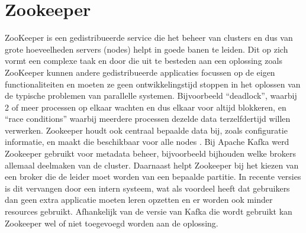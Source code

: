 \section{Zookeeper}
ZooKeeper is een gedistribueerde service die het beheer van clusters en dus van grote hoeveelheden servers (nodes) helpt in goede banen te leiden. Dit op zich vormt een complexe taak en door die uit te besteden aan een oplossing zoals ZooKeeper kunnen andere gedistribueerde applicaties focussen op de eigen functionaliteiten en moeten ze geen ontwikkelingstijd stoppen in het oplossen van de typische problemen van parallelle systemen. Bijvoorbeeld ``deadlock'', waarbij 2 of meer processen op elkaar wachten en dus elkaar voor altijd blokkeren, en ``race conditions'' waarbij meerdere processen dezelde data terzelfdertijd willen verwerken. 
Zookeeper houdt ook centraal bepaalde data bij, zoals configuratie informatie, en maakt die beschikbaar voor alle nodes \autocite{ASF2023}.
\newline
\newline 
Bij Apache Kafka werd Zookeeper gebruikt voor metadata beheer, bijvoorbeeld bijhouden welke brokers allemaal deelmaken van de cluster. Daarnaast helpt Zookeeper bij het kiezen van een broker die de leider moet worden van een bepaalde partitie. In recente versies is dit vervangen door een intern systeem, wat als voordeel heeft dat gebruikers dan geen extra applicatie moeten leren opzetten en er worden ook minder resources gebruikt.
\autocite{Conduktor2023}
\newline
\newline
Afhankelijk van de versie van Kafka die wordt gebruikt kan Zookeeper wel of niet toegevoegd worden aan de oplossing.

